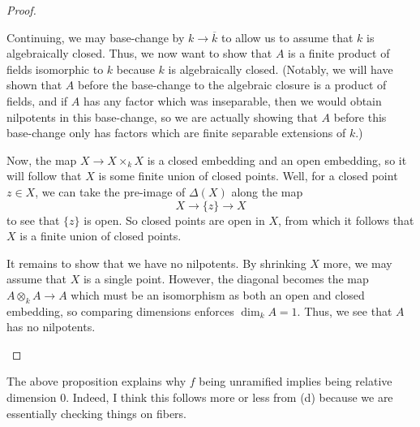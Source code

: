 \documentclass[../notes.tex]{subfiles}
\begin{document}
\begin{proof}
\begin{itemize}
		Continuing, we may base-change by $k\to\overline k$ to allow us to assume that $k$ is algebraically closed. Thus, we now want to show that $A$ is a finite product of fields isomorphic to $k$ because $k$ is algebraically closed. (Notably, we will have shown that $A$ before the base-change to the algebraic closure is a product of fields, and if $A$ has any factor which was inseparable, then we would obtain nilpotents in this base-change, so we are actually showing that $A$ before this base-change only has factors which are finite separable extensions of $k$.)

		Now, the map $X\to X\times_kX$ is a closed embedding and an open embedding, so it will follow that $X$ is some finite union of closed points. Well, for a closed point $z\in X$, we can take the pre-image of $\Delta(X)$ along the map
		\[X\to\{z\}\to X\]
		to see that $\{z\}$ is open. So closed points are open in $X$, from which it follows that $X$ is a finite union of closed points.

		It remains to show that we have no nilpotents. By shrinking $X$ more, we may assume that $X$ is a single point. However, the diagonal becomes the map $A\otimes_kA\to A$ which must be an isomorphism as both an open and closed embedding, so comparing dimensions enforces $\dim_kA=1$. Thus, we see that $A$ has no nilpotents.
		\qedhere
	\end{itemize}
\end{proof}
\begin{remark}
	The above proposition explains why $f$ being unramified implies being relative dimension $0$. Indeed, I think this follows more or less from (d) because we are essentially checking things on fibers.
\end{remark}
\end{document}

